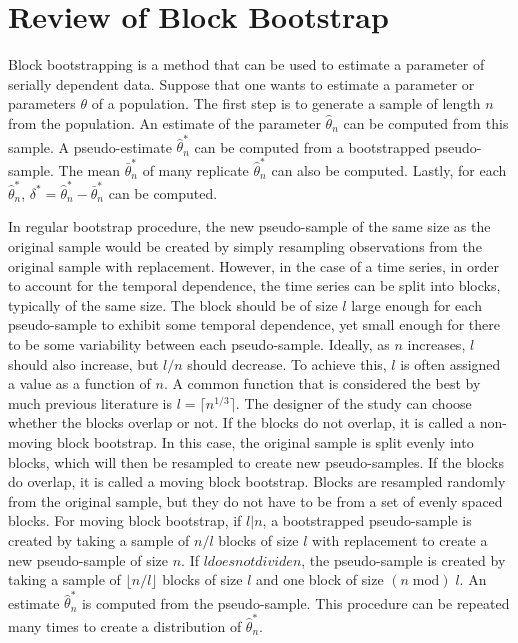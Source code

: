 \documentclass[12pt, letterpaper, titlepage]{article}
\begin{document}
\section{Review of Block Bootstrap}
\label{sec:blkbootreview}

Block bootstrapping is a method that can be used to estimate a parameter of serially dependent data. Suppose that one wants to estimate a parameter or parameters $\theta$ of a population. The first step is to generate a sample of length $n$ from the population. An estimate of the parameter $\hat{\theta}_{n}$ can be computed from this sample. A pseudo-estimate $\hat\theta_n^*$ can be computed from a bootstrapped pseudo-sample. The mean $\bar\theta_n^*$ of many replicate $\hat\theta_n^*$ can also be computed. Lastly, for each $\hat\theta_n^*$, $\delta^* = \hat\theta_n^* - \bar\theta_n^*$ can be computed.

In regular bootstrap procedure, the new pseudo-sample of the same size as the original sample would be created by simply resampling observations from the original sample with replacement. However, in the case of a time series, in order to account for the temporal dependence, the time series can be split into blocks, typically of the same size. The block should be of size $l$ large enough for each pseudo-sample to exhibit some temporal dependence, yet small enough for there to be some variability between each pseudo-sample. Ideally, as $n$ increases, $l$ should also increase, but $l / n$ should decrease. To achieve this, $l$ is often assigned a value as a function of $n$. A common function that is considered the best by much previous literature is $l = \lceil n^{1/3} \rceil$. \citep{buhlmann1999block} The designer of the study can choose whether the blocks overlap or not. If the blocks do not overlap, it is called a non-moving block bootstrap. In this case, the original sample is split evenly into blocks, which will then be resampled to create new pseudo-samples. If the blocks do overlap, it is called a moving block bootstrap. Blocks are resampled randomly from the original sample, but they do not have to be from a set of evenly spaced blocks. For moving block bootstrap, if $l \vert n$, a bootstrapped pseudo-sample is created by taking a sample of $n / l$ blocks of size $l$ with replacement to create a new pseudo-sample of size $n$. If $l does not divide n$, the pseudo-sample is created by taking a sample of $\lfloor n / l \rfloor$ blocks of size $l$ and one block of size $(n \;\mathrm{mod})\; l$. An estimate $\hat\theta_n^*$ is computed from the pseudo-sample. This procedure can be repeated many times to create a distribution of $\hat\theta_n^*$. 
\end{document}
